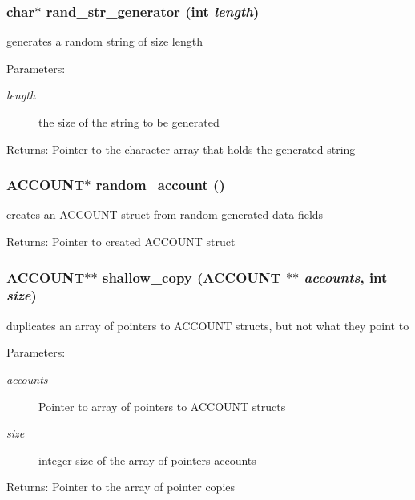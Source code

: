 \subsubsection{\setlength{\rightskip}{0pt plus 5cm}char$\ast$ rand\_\-str\_\-generator (int {\em length})}\label{account_8c_823f9b82f39f1589534e5771a1e50e11}


generates a random string of size length \begin{Desc}
\item[Parameters:]
\begin{description}
\item[{\em length}]the size of the string to be generated \end{description}
\end{Desc}
\begin{Desc}
\item[Returns:]Pointer to the character array that holds the generated string \end{Desc}
\subsubsection{\setlength{\rightskip}{0pt plus 5cm}\bf{ACCOUNT}$\ast$ random\_\-account ()}\label{account_8c_cb814f996bafab0f36b11c4e5005ddb0}


creates an ACCOUNT struct from random generated data fields \begin{Desc}
\item[Returns:]Pointer to created ACCOUNT struct \end{Desc}
\subsubsection{\setlength{\rightskip}{0pt plus 5cm}\bf{ACCOUNT}$\ast$$\ast$ shallow\_\-copy (\bf{ACCOUNT} $\ast$$\ast$ {\em accounts}, int {\em size})}\label{account_8c_baa77bc2f11d5b2a096c7e38d2856581}


duplicates an array of pointers to ACCOUNT structs, but not what they point to \begin{Desc}
\item[Parameters:]
\begin{description}
\item[{\em accounts}]Pointer to array of pointers to ACCOUNT structs \item[{\em size}]integer size of the array of pointers accounts \end{description}
\end{Desc}
\begin{Desc}
\item[Returns:]Pointer to the array of pointer copies \end{Desc}
